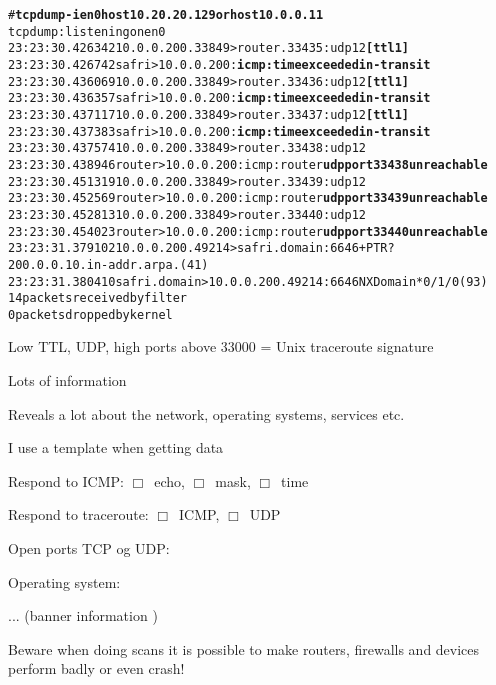 \documentclass[20pt,landscape,a4paper,footrule]{foils}
\begin{document}
\begin{alltt}
\footnotesize # {\bfseries tcpdump -i en0 host 10.20.20.129 or host 10.0.0.11}
tcpdump: listening on en0
23:23:30.426342 10.0.0.200.33849 > router.33435: udp 12 {\bf [ttl 1]}
23:23:30.426742 safri > 10.0.0.200: {\bf icmp: time exceeded in-transit}
23:23:30.436069 10.0.0.200.33849 > router.33436: udp 12 {\bf [ttl 1]}
23:23:30.436357 safri > 10.0.0.200: {\bf icmp: time exceeded in-transit}
23:23:30.437117 10.0.0.200.33849 > router.33437: udp 12 {\bf [ttl 1]}
23:23:30.437383 safri > 10.0.0.200: {\bf icmp: time exceeded in-transit}
23:23:30.437574 10.0.0.200.33849 > router.33438: udp 12
23:23:30.438946 router > 10.0.0.200: icmp: router {\bf udp port 33438 unreachable}
23:23:30.451319 10.0.0.200.33849 > router.33439: udp 12
23:23:30.452569 router > 10.0.0.200: icmp: router {\bf udp port 33439 unreachable}
23:23:30.452813 10.0.0.200.33849 > router.33440: udp 12
23:23:30.454023 router > 10.0.0.200: icmp: router {\bf udp port 33440 unreachable}
23:23:31.379102 10.0.0.200.49214 > safri.domain:  6646+ PTR?
200.0.0.10.in-addr.arpa. (41)
23:23:31.380410 safri.domain > 10.0.0.200.49214:  6646 NXDomain* 0/1/0 (93)
14 packets received by filter
0 packets dropped by kernel
\end{alltt}

\vskip 5mm
\centerline{Low TTL, UDP, high ports above 33000 = Unix traceroute signature}





\begin{list1}
\item Lots of information
\item Reveals a lot about the network, operating systems, services etc.
\item I use a template when getting data
  \begin{list2}
    \item Respond to ICMP: $\Box$\  echo, $\Box$\ mask, $\Box$\ time
\item Respond to traceroute: $\Box$\ ICMP, $\Box$\ UDP
\item Open ports TCP og UDP:
\item Operating system:
\item ... (banner information )
  \end{list2}
\item Beware when doing scans it is possible to make routers, firewalls and devices perform badly or even crash!
\end{list1}



\myquestionspage
\end{document}
